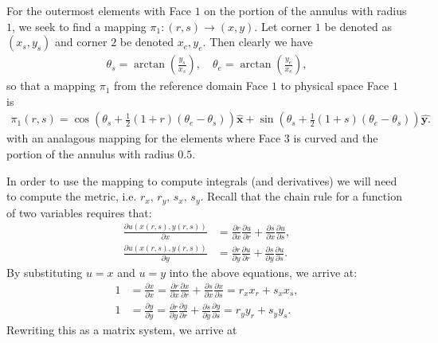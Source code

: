 \documentclass{article}
\newcommand{\pdiff}[2]{\frac{\partial {#1}}{\partial {#2}}}
\begin{document}
For the outermost elements with Face $1$ on the portion of the annulus with radius $1$, we seek to find a mapping $\pi_1 : (r,s) \to (x,y)$. Let corner $1$ be denoted as $(x_s,y_s)$ and corner $2$ be denoted $x_e,y_e$. Then clearly we have 
  \begin{align*}
    \theta _s = \arctan \left(\frac{y_s}{x_s}\right), \quad \theta_e = \arctan \left(\frac{y_e}{x_e}\right),
  \end{align*}
so that a mapping $\pi_1$ from the reference domain Face $1$ to physical space Face $1$ is
  \begin{align*}
    \pi_1(r,s) = \cos \left( \theta_s + \frac{1}{2}(1 + r)(\theta_e - \theta_s) \right) \hat{\textbf{x}} + \sin \left( \theta_s + \frac{1}{2}(1 + s)(\theta_e - \theta_s) \right) \hat{\textbf{y.}}
  \end{align*}
with an analagous mapping for the elements where Face $3$ is curved and the portion of the annulus with radius $0.5$.

In order to use the mapping to compute integrals (and derivatives) we will need to compute the metric, i.e. $r_x, \, r_y, \, s_x, \, s_y$. Recall that the chain rule for a function of two variables requires that:
  \begin{align*}
    \pdiff{u(x(r,s),y(r,s))}{x} & = \pdiff{r}{x}\pdiff{u}{r} + \pdiff{s}{x} \pdiff{u}{s}, \\
    \pdiff{u(x(r,s),y(r,s))}{y} & = \pdiff{r}{y}\pdiff{u}{r} + \pdiff{s}{y} \pdiff{u}{s}.
  \end{align*}
By substituting $u = x$ and $u = y$ into the above equations, we arrive at:
  \begin{align*}
    1 & = \pdiff{x}{x} = \pdiff{r}{x}\pdiff{x}{r} + \pdiff{s}{x} \pdiff{x}{s} = r_x x_r + s_x x_s, \\
    1 & = \pdiff{y}{y}  = \pdiff{r}{y}\pdiff{y}{r} + \pdiff{s}{y} \pdiff{y}{s} = r_y y_r + s_y y_s.  
  \end{align*}
Rewriting this as a matrix system, we arrive at 
\end{document}
